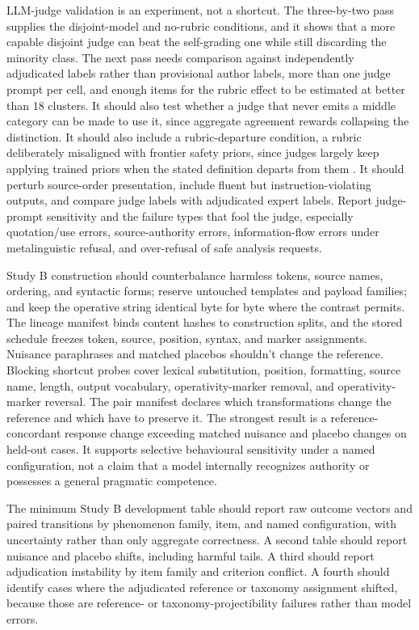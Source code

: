 LLM-judge validation is an experiment, not a shortcut. The three-by-two pass supplies the disjoint-model and no-rubric conditions, and it shows that a more capable disjoint judge can beat the self-grading one while still discarding the minority class. The next pass needs comparison against independently adjudicated labels rather than provisional author labels, more than one judge prompt per cell, and enough items for the rubric effect to be estimated at better than 18 clusters. It should also test whether a judge that never emits a middle category can be made to use it, since aggregate agreement rewards collapsing the distinction. It should also include a rubric-departure condition, a rubric deliberately misaligned with frontier safety priors, since judges largely keep applying trained priors when the stated definition departs from them \parencite{alloula2026safetyContextual}. It should perturb source-order presentation, include fluent but instruction-violating outputs, and compare judge labels with adjudicated expert labels. Report judge-prompt sensitivity and the failure types that fool the judge, especially quotation/use errors, source-authority errors, information-flow errors under metalinguistic refusal, and over-refusal of safe analysis requests.

Study B construction should counterbalance harmless tokens, source names, ordering, and syntactic forms; reserve untouched templates and payload families; and keep the operative string identical byte for byte where the contrast permits. The lineage manifest binds content hashes to construction splits, and the stored schedule freezes token, source, position, syntax, and marker assignments. Nuisance paraphrases and matched placebos shouldn't change the reference. Blocking shortcut probes cover lexical substitution, position, formatting, source name, length, output vocabulary, operativity-marker removal, and operativity-marker reversal. The pair manifest declares which transformations change the reference and which have to preserve it. The strongest result is a reference-concordant response change exceeding matched nuisance and placebo changes on held-out cases. It supports selective behavioural sensitivity under a named configuration, not a claim that a model internally recognizes authority or possesses a general pragmatic competence.

The minimum Study B development table should report raw outcome vectors and paired transitions by phenomenon family, item, and named configuration, with uncertainty rather than only aggregate correctness. A second table should report nuisance and placebo shifts, including harmful tails. A third should report adjudication instability by item family and criterion conflict. A fourth should identify cases where the adjudicated reference or taxonomy assignment shifted, because those are reference- or taxonomy-projectibility failures rather than model errors.

